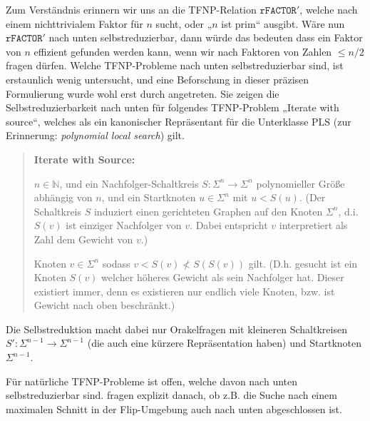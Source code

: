 Zum Verständnis erinnern wir uns an die TFNP-Relation $\mathtt{rFACTOR}'$, welche nach einem nichttrivialem Faktor für $n$ sucht, oder „$n$ ist prim“ ausgibt. Wäre nun $\mathtt{rFACTOR}'$  nach unten selbstreduzierbar, dann würde das bedeuten dass ein Faktor von $n$ effizient gefunden werden kann, wenn wir nach Faktoren von Zahlen $\leq n/2$ fragen dürfen.
Welche TFNP-Probleme nach unten selbstreduzierbar sind, ist erstaunlich wenig untersucht, und eine Beforschung in dieser präzisen Formulierung wurde wohl erst durch \textcite{harsha_downward_2023} angetreten.
Sie zeigen die Selbstreduzierbarkeit nach unten für folgendes TFNP-Problem „Iterate with source“, welches als ein kanonischer Repräsentant für die Unterklasse $\mathrm{PLS}$ (zur Erinnerung: \emph{polynomial local search}) gilt.
\begin{quote}
    \textbf{Iterate with Source:}
    \begin{description}[nosep]
        \item[Gegeben:] $n\in\mathbb N$, und ein Nachfolger-Schaltkreis $S\colon\Sigma^n\to\Sigma^n$ polynomieller Größe abhängig von $n$, und ein Startknoten $u\in\Sigma^n$ mit $u<S(u)$. (Der Schaltkreis $S$ induziert einen gerichteten Graphen auf den Knoten $\Sigma^n$, d.i. $S(v)$ ist einziger Nachfolger von $v$. Dabei entspricht $v$ interpretiert als Zahl dem Gewicht von $v$.)
        \item[Gesucht:] Knoten $v\in\Sigma^n$ sodass $v<S(v)\not < S(S(v))$ gilt.
            (D.h. gesucht ist ein Knoten $S(v)$ welcher höheres Gewicht als sein Nachfolger hat. Dieser existiert immer, denn es existieren nur endlich viele Knoten, bzw. ist Gewicht nach oben beschränkt.)
    \end{description}
\end{quote}
Die Selbstreduktion macht dabei nur Orakelfragen mit kleineren Schaltkreisen $S'\colon\allowbreak\Sigma^{n-1}\to\Sigma^{n-1}$ (die auch eine kürzere Repräsentation haben) und Startknoten $\Sigma^{n-1}$.

Für natürliche  TFNP-Probleme ist offen, welche davon nach unten selbstreduzierbar sind. 
\citeauthor{harsha_downward_2023} fragen explizit danach, ob z.B. die Suche nach einem maximalen Schnitt in der Flip-Umgebung auch nach unten abgeschlossen ist.


